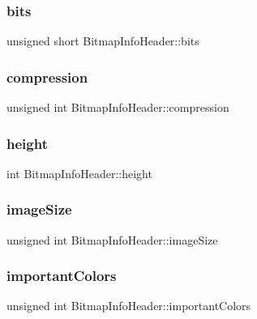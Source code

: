 \subsubsection{\texorpdfstring{bits}{bits}}
{\footnotesize\ttfamily unsigned short Bitmap\+Info\+Header\+::bits}

\hypertarget{struct_bitmap_info_header_a87fb38b0fe68db4bed899b9733d1b7e9}{}\label{struct_bitmap_info_header_a87fb38b0fe68db4bed899b9733d1b7e9} 
\subsubsection{\texorpdfstring{compression}{compression}}
{\footnotesize\ttfamily unsigned int Bitmap\+Info\+Header\+::compression}

\hypertarget{struct_bitmap_info_header_aaa1d31efc13210020a38d435e4961df9}{}\label{struct_bitmap_info_header_aaa1d31efc13210020a38d435e4961df9} 
\subsubsection{\texorpdfstring{height}{height}}
{\footnotesize\ttfamily int Bitmap\+Info\+Header\+::height}

\hypertarget{struct_bitmap_info_header_a79bc984a7fd1c0f00ede6aa09143939f}{}\label{struct_bitmap_info_header_a79bc984a7fd1c0f00ede6aa09143939f} 
\subsubsection{\texorpdfstring{image\+Size}{imageSize}}
{\footnotesize\ttfamily unsigned int Bitmap\+Info\+Header\+::image\+Size}

\hypertarget{struct_bitmap_info_header_a9d87941fcc414085f7361fd89818ee3f}{}\label{struct_bitmap_info_header_a9d87941fcc414085f7361fd89818ee3f} 
\subsubsection{\texorpdfstring{important\+Colors}{importantColors}}
{\footnotesize\ttfamily unsigned int Bitmap\+Info\+Header\+::important\+Colors}

